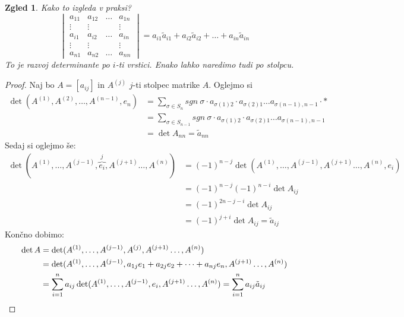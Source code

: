 \documentclass[10pt, a4paper]{article}
\newtheorem{zgled}{Zgled}[section]
\newenvironment{noticeC}{%
  \tcolorbox[%
  notitle,
  empty,
  enhanced,  %
  breakable,
  coltext=black, 
  fontupper=\rmfamily,
  parbox=false,
  noparskip,
  sharp corners,
  boxrule=-1pt,  %
  frame hidden,
  left=7pt,  %
  right=7pt,
  top=5pt,
  bottom=5pt,
  before skip=2.5ex plus 2pt,
  after skip=2.5ex plus 2pt,
  overlay unbroken and last={%
  },
  ]}
{\endtcolorbox}
\newenvironment{dokaz}%
  {\begin{noticeC}\begin{proof}}%
  {\end{proof}\end{noticeC}}
\begin{document}
\begin{zgled}
    Kako to izgleda v praksi?
    $$\begin{vmatrix}
        a_{11} & a_{12} & \dots & a_{1n}\\
        \vdots & \vdots & & \vdots\\
        a_{i1} & a_{i2} & \dots & a_{in}\\
        \vdots & \vdots & & \vdots\\
        a_{n1} & a_{n2} & \dots & a_{nn}
    \end{vmatrix} = a_{i1} \tilde{a}_{i1} + a_{i2} \tilde{a}_{i2} + \dots + a_{in} \tilde{a}_{in}$$
    To je razvoj determinante po $i$-ti vrstici. Enako lahko naredimo tudi po stolpcu.
\end{zgled}

\begin{dokaz}
    Naj bo $A = [a_{ij}]$ in $A^{(j)}$ $j$-ti stolpec matrike $A$.
    Oglejmo si 
    \begin{align*}
        \det(A^{(1)}, A^{(2)}, \dots, A^{(n-1)}, e_n) &= \sum_{\sigma \in S_n} sgn\ \sigma \cdot a_{\sigma(1) 2} \cdot a_{\sigma(2)1} \dots a_{\sigma(n-1), n-1} \cdot *\\
        &= \sum_{\sigma \in S_{n-1}} sgn\ \sigma \cdot a_{\sigma(1) 2} \cdot a_{\sigma(2)1} \dots a_{\sigma(n-1), n-1}\\
        &= \det A_{nn} = \tilde{a}_{nn}
    \end{align*}
    Sedaj si oglejmo še:
    \begin{align*}
        \det(A^{(1)},\dots, A^{(j-1)}, \overbrace{e_i}^{j}, A^{(j+1)} \dots, A^{(n)}) &= (-1)^{n-j} \det(A^{(1)},\dots, A^{(j-1)}, A^{(j+1)} \dots, A^{(n)}, e_i)\\
        &= (-1)^{n-j} (-1)^{n-i} \det A_{ij}\\
        &= (-1)^{2n - j -i} \det A_{ij}\\
        &= (-1)^{j+i} \det A_{ij} = \tilde{a}_{ij}
    \end{align*}
    Končno dobimo:
    \begin{align*}
        \det A &= \det(A^{(1)},\dots, A^{(j-1)}, A^{(j)}, A^{(j+1)} \dots, A^{(n)})\\
        &= \det(A^{(1)},\dots, A^{(j-1)}, a_{1j} e_1 + a_{2j} e_2 + \dots + a_{nj} e_n, A^{(j+1)} \dots, A^{(n)})\\
        &= \sum_{i = 1} ^{n} a_{ij} \det(A^{(1)},\dots, A^{(j-1)}, e_i, A^{(j+1)} \dots, A^{(n)})
        = \sum_{i = 1} ^{n} a_{ij} \tilde{a}_{ij} \qedhere
    \end{align*}
\end{dokaz}
\end{document}
